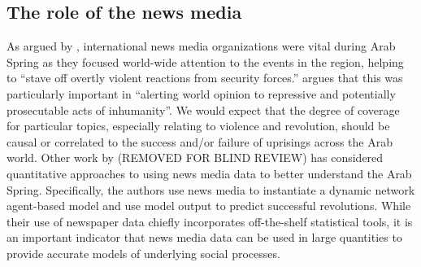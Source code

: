 


	
\subsection{The role of the news media}

As argued by \cite[][pg. 60]{hussain_what_2013}, international news media organizations were vital during Arab Spring as they focused world-wide attention to the events in the region, helping to ``stave off overtly violent reactions from security forces.''  \cite[][pg. 656]{cottle_media_2011} argues that this was particularly important in ``alerting world opinion to repressive and potentially prosecutable acts of inhumanity''.  We would expect that the degree of coverage for particular topics, especially relating to violence and revolution, should be causal or correlated to the success and/or failure of uprisings across the Arab world. Other work by (REMOVED FOR BLIND REVIEW) has considered quantitative approaches to using news media data to better understand the Arab Spring. Specifically, the authors use news media to instantiate a dynamic network agent-based model and use model output to predict successful revolutions. While their use of newspaper data chiefly incorporates off-the-shelf statistical tools, it is an important indicator that news media data can be used in large quantities to provide accurate models of underlying social processes.

